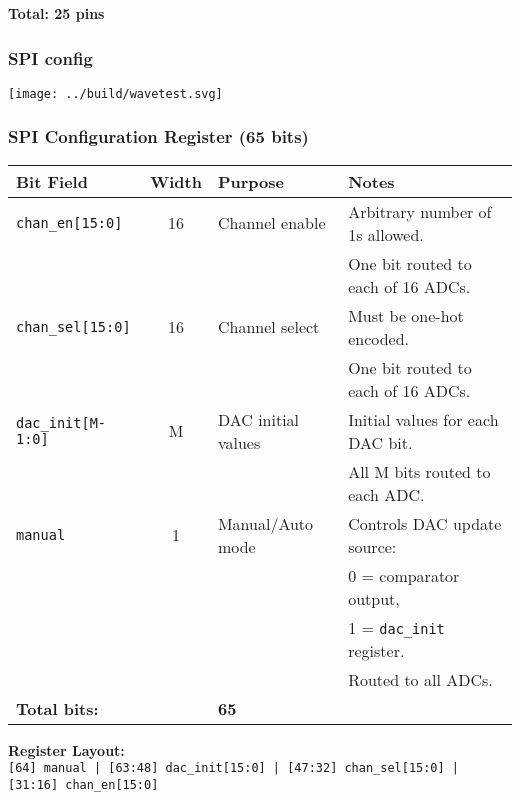 \documentclass[aspectratio=169]{beamer}
\begin{document}
\begin{frame}
\begin{center}
    \vspace{0.3cm}
    \textbf{Total: 25 pins}
  \end{center}
\end{frame}

\begin{frame}
  \frametitle{SPI config}

    \texttt{[image: ../build/wavetest.svg]}

  \end{frame}

\begin{frame}
  \frametitle{SPI Configuration Register (65 bits)}
  \begin{center}
    \scriptsize
    \begin{tabular}{|l|c|l|l|}
    \hline
    \textbf{Bit Field} & \textbf{Width} & \textbf{Purpose} & \textbf{Notes} \\
    \hline
    \texttt{chan\_en[15:0]} & 16 & Channel enable & Arbitrary number of 1s allowed. \\
                            &    &                & One bit routed to each of 16 ADCs. \\
    \hline
    \texttt{chan\_sel[15:0]} & 16 & Channel select & Must be one-hot encoded. \\
                             &    &                & One bit routed to each of 16 ADCs. \\
    \hline
    \texttt{dac\_init[M-1:0]} & M & DAC initial values & Initial values for each DAC bit. \\
                             &    &                    & All M bits routed to each ADC. \\
    \hline
    \texttt{manual} & 1 & Manual/Auto mode & Controls DAC update source: \\
                    &   &                  & 0 = comparator output, \\
                    &   &                  & 1 = \texttt{dac\_init} register. \\
                    &   &                  & Routed to all ADCs. \\
    \hline
    \multicolumn{2}{|l|}{\textbf{Total bits:}} & \textbf{65} & \\
    \hline
    \end{tabular}
    
    \vspace{0.4cm}
    \textbf{Register Layout:} \\
    \texttt{[64] manual | [63:48] dac\_init[15:0] | [47:32] chan\_sel[15:0] | [31:16] chan\_en[15:0]}
  \end{center}
\end{frame}
\end{document}
